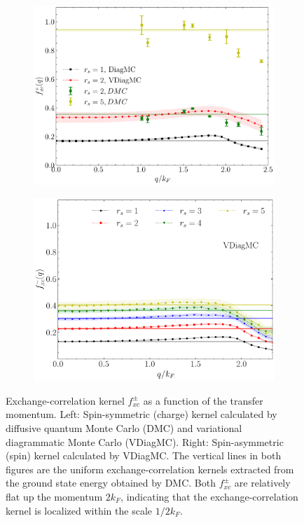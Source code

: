 \documentclass[reprint,amsmath,amssymb,aps,prb]{revtex4-1}
\begin{document}
\begin{figure}
    \centering
    \begin{subfigure}[b]{0.48\linewidth}
        \centering
        \includegraphics[width=\linewidth]{fxc_charge.pdf}
        \label{fig:charge_xc}
    \end{subfigure}
    \begin{subfigure}[b]{0.48\linewidth}
        \centering
        \includegraphics[width=\linewidth]{fxc_spin.pdf}
        \label{fig:spin_xc}
    \end{subfigure}
    \caption{Exchange-correlation kernel $f_{xc}^\pm$ as a function of the transfer momentum. Left: Spin-symmetric (charge) kernel calculated by diffusive quantum Monte Carlo (DMC) and variational diagrammatic Monte Carlo (VDiagMC). Right: Spin-asymmetric (spin) kernel calculated by VDiagMC. The vertical lines in both figures are the uniform exchange-correlation kernels extracted from the ground state energy obtained by DMC. Both $f_{xc}^\pm$ are relatively flat up the momentum $2k_F$, indicating that the exchange-correlation kernel is localized within the scale $1/2k_F$.}
    \label{fig:fxc}
\end{figure}
\end{document}
